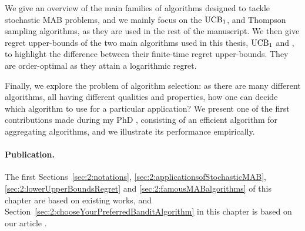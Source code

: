 We give an overview of the main families of algorithms designed to tackle stochastic MAB problems, and we mainly focus on the $\mathrm{UCB}_1$, \klUCB{} and Thompson sampling algorithms, as they are used in the rest of the manuscript.
%
We then give regret upper-bounds of the two main algorithms used in this thesis, $\mathrm{UCB}_1$ and \klUCB, to highlight the difference between their finite-time regret upper-bounds. They are order-optimal as they attain a logarithmic regret.

Finally, we explore the problem of algorithm selection: as there are many different algorithms, all having different qualities and properties, how one can decide which algorithm to use for a particular application?
We present one of the first contributions made during my PhD \cite{Besson2018WCNC}, consisting of an efficient algorithm for aggregating algorithms,
and we illustrate its performance empirically.


\paragraph{Publication.}
%
The first Sections~\ref{sec:2:notations}, \ref{sec:2:applicationsofStochasticMAB}, \ref{sec:2:lowerUpperBoundsRegret} and \ref{sec:2:famousMABalgorithms} of this chapter are based on existing works,
and Section~\ref{sec:2:chooseYourPreferredBanditAlgorithm} in this chapter is based on our article \cite{Besson2018WCNC}.


